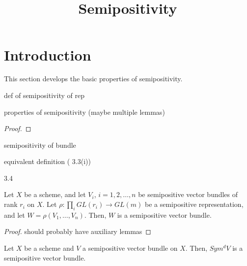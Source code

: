 


\newcommand{\todo}[1]{\footnote{\textbf{TODO.} #1}}

\title{Semipositivity}
\maketitle


\section{Introduction}
This section develops the basic properties of semipositivity.


\begin{definition}
def of semipositivity of rep
\end{definition}

\begin{lemma}
properties of semipositivity (maybe multiple lemmas)
\end{lemma}


\begin{proof}

\end{proof}


\begin{definition}
semipositivity of bundle
\end{definition}

\begin{lemma}
equivalent definition ( 3.3(i))
\end{lemma}

\begin{lemma}
3.4
\end{lemma}

\begin{lemma}\label{apply_rho_still_semipos}
Let $X$ be a scheme, and let $V_i$, $i=1,2,\ldots,n$ be semipositive vector bundles of rank $r_i$ on $X$. Let $\rho:\prod_i GL(r_i)\to GL(m)$ be a semipositive representation, and let $W=\rho(V_1,\ldots,V_n)$. Then, $W$ is a semipositive vector bundle.
\end{lemma}

\begin{proof}
should probably have auxiliary lemmas
\end{proof}

\begin{lemma}
Let $X$ be a scheme and $V$ a semipositive vector bundle on $X$. Then, $Sym^dV$ is a semipositive vector bundle.
\end{lemma}

